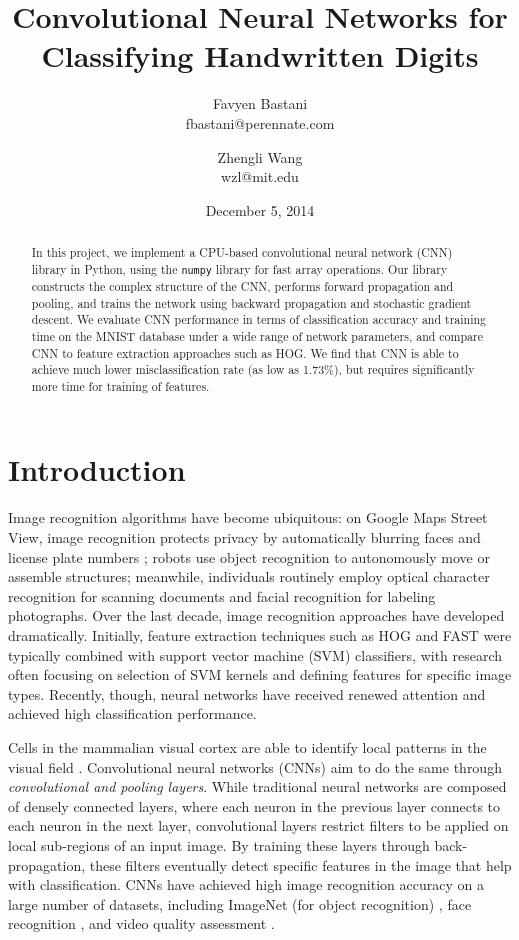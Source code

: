 \documentclass[10pt,twocolumn]{article}
\title{Convolutional Neural Networks for Classifying Handwritten Digits}
\date{December 5, 2014}
\author{
	Favyen Bastani \\
	fbastani@perennate.com
	\and
	Zhengli Wang \\
	wzl@mit.edu
}
\begin{document}
\maketitle

\begin{abstract}
In this project, we implement a CPU-based convolutional neural network (CNN) library in Python, using the \texttt{numpy} library for fast array operations. Our library constructs the complex structure of the CNN, performs forward propagation and pooling, and trains the network using backward propagation and stochastic gradient descent. We evaluate CNN performance in terms of classification accuracy and training time on the MNIST database under a wide range of network parameters, and compare CNN to feature extraction approaches such as HOG. We find that CNN is able to achieve much lower misclassification rate (as low as 1.73\%), but requires significantly more time for training of features.
\end{abstract}

\section{Introduction} \label{sec:introduction}

Image recognition algorithms have become ubiquitous: on Google Maps Street View, image recognition protects privacy by automatically blurring faces and license plate numbers \cite{streetview}; robots use object recognition to autonomously move or assemble structures; meanwhile, individuals routinely employ optical character recognition for scanning documents and facial recognition for labeling photographs. Over the last decade, image recognition approaches have developed dramatically. Initially, feature extraction techniques such as HOG and FAST were typically combined with support vector machine (SVM) classifiers, with research often focusing on selection of SVM kernels and defining features for specific image types. Recently, though, neural networks have received renewed attention and achieved high classification performance.

Cells in the mammalian visual cortex are able to identify local patterns in the visual field \cite{website:lenet}. Convolutional neural networks (CNNs) aim to do the same through \emph{convolutional and pooling layers}. While traditional neural networks are composed of densely connected layers, where each neuron in the previous layer connects to each neuron in the next layer, convolutional layers restrict filters to be applied on local sub-regions of an input image. By training these layers through back-propagation, these filters eventually detect specific features in the image that help with classification. CNNs have achieved high image recognition accuracy on a large number of datasets, including ImageNet (for object recognition) \cite{imagenet}, face recognition \cite{facerec}, and video quality assessment \cite{videoquality}.
\end{document}
